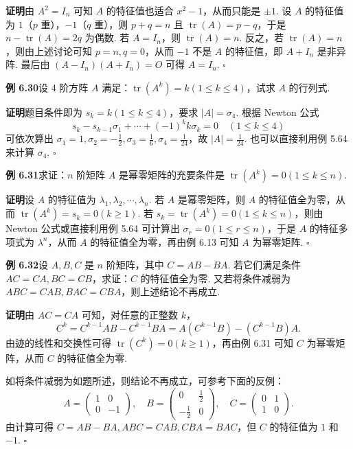 \documentclass[UTF8, 12pt, fontset=fandol, oneside]{ctexart}
\begin{document}
\noindent\textbf{证明}\quad 由 $A^2=I_n$ 可知 $A$ 的特征值也适合 $x^2-1$，从而只能是 $\pm 1$. 设 $A$ 的特征值为 $1$（$p$ 重），$-1$（$q$ 重），则 $p+q=n$ 且 $\operatorname{tr}(A)=p-q$，于是 $n-\operatorname{tr}(A)=2q$ 为偶数. 若 $A=I_n$，则 $\operatorname{tr}(A)=n$. 反之，若 $\operatorname{tr}(A)=n$，则由上述讨论可知 $p=n,q=0$，从而 $-1$ 不是 $A$ 的特征值，即 $A+I_n$ 是非异阵. 最后由 $(A-I_n)(A+I_n)=O$ 可得 $A=I_n$. $\square$

\noindent\textbf{例 6.30}\quad 设 4 阶方阵 $A$ 满足：$\operatorname{tr}(A^k)=k(1\le k\le 4)$，试求 $A$ 的行列式.

\noindent\textbf{证明}\quad 题目条件即为 $s_k=k(1\le k\le 4)$，要求 $|A|=\sigma_4$. 根据 Newton 公式
\[
s_k-s_{k-1}\sigma_1+\cdots+(-1)^kk\sigma_k=0\quad (1\le k\le 4)
\]
可依次算出 $\sigma_1=1,\sigma_2=-\frac{1}{2},\sigma_3=\frac{1}{6},\sigma_4=\frac{1}{24}$，故 $|A|=\frac{1}{24}$. 也可以直接利用例 5.64 来计算 $\sigma_4$. $\square$

\noindent\textbf{例 6.31}\quad 求证：$n$ 阶矩阵 $A$ 是幂零矩阵的充要条件是 $\operatorname{tr}(A^k)=0(1\le k\le n)$.

\noindent\textbf{证明}\quad 设 $A$ 的特征值为 $\lambda_1,\lambda_2,\cdots,\lambda_n$. 若 $A$ 是幂零矩阵，则 $A$ 的特征值全为零，从而 $\operatorname{tr}(A^k)=s_k=0(k\ge 1)$. 若 $s_k=\operatorname{tr}(A^k)=0(1\le k\le n)$，则由 Newton 公式或直接利用例 5.64 可计算出 $\sigma_r=0(1\le r\le n)$，于是 $A$ 的特征多项式为 $\lambda^n$，从而 $A$ 的特征值全为零，再由例 6.13 可知 $A$ 为幂零矩阵. $\square$

\noindent\textbf{例 6.32}\quad 设 $A,B,C$ 是 $n$ 阶矩阵，其中 $C=AB-BA$. 若它们满足条件 $AC=CA,BC=CB$，求证：$C$ 的特征值全为零. 又若将条件减弱为 $ABC=CAB,BAC=CBA$，则上述结论不再成立.

\noindent\textbf{证明}\quad 由 $AC=CA$ 可知，对任意的正整数 $k$，
\[
C^k=C^{k-1}AB-C^{k-1}BA=A(C^{k-1}B)-(C^{k-1}B)A.
\]
由迹的线性和交换性可得 $\operatorname{tr}(C^k)=0(k\ge 1)$，再由例 6.31 可知 $C$ 为幂零矩阵，从而 $C$ 的特征值全为零.

如将条件减弱为如题所述，则结论不再成立，可参考下面的反例：
\[
A=\left(\begin{array}{cc}
1 & 0\\
0 & -1
\end{array}\right),\quad
B=\left(\begin{array}{cc}
0 & \frac{1}{2}\\
-\frac{1}{2} & 0
\end{array}\right),\quad
C=\left(\begin{array}{cc}
0 & 1\\
1 & 0
\end{array}\right).
\]
由计算可得 $C=AB-BA,ABC=CAB,CBA=BAC$，但 $C$ 的特征值为 $1$ 和 $-1$. $\square$
\end{document}
